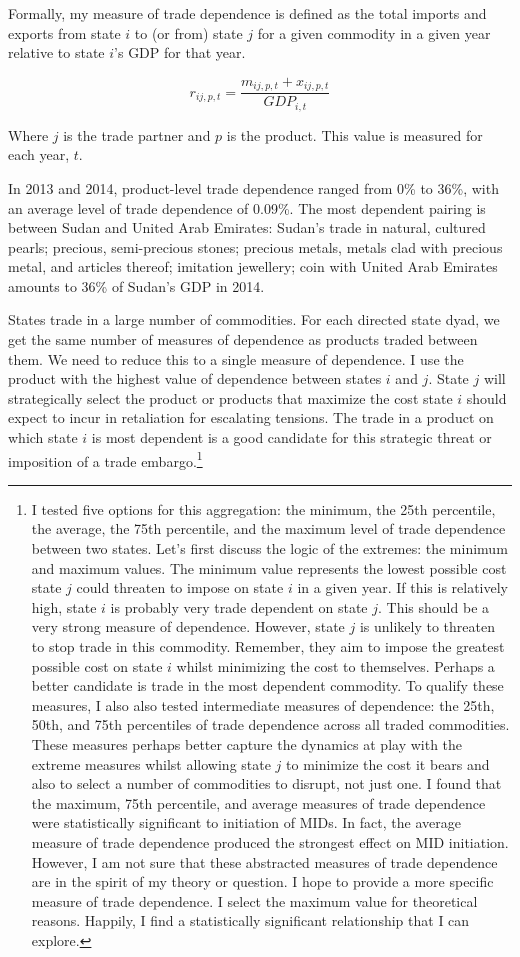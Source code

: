 \documentclass[
  letterpaper,
]{article}
\begin{document}
Formally, my measure of trade dependence is defined as the total imports
and exports from state \(i\) to (or from) state \(j\) for a given
commodity in a given year relative to state \(i\)'s GDP for that year.

\[
r_{ij,p,t} = \frac{m_{ij,p,t} + x_{ij,p,t}}{GDP_{i,t}}
\]

Where \(j\) is the trade partner and \(p\) is the product. This value is
measured for each year, \(t\).

In 2013 and 2014, product-level trade dependence ranged from 0\% to
36\%, with an average level of trade dependence of 0.09\%. The most
dependent pairing is between Sudan and United Arab Emirates: Sudan's
trade in natural, cultured pearls; precious, semi-precious stones;
precious metals, metals clad with precious metal, and articles thereof;
imitation jewellery; coin with United Arab Emirates amounts to 36\% of
Sudan's GDP in 2014.

States trade in a large number of commodities. For each directed state
dyad, we get the same number of measures of dependence as products
traded between them. We need to reduce this to a single measure of
dependence. I use the product with the highest value of dependence
between states \(i\) and \(j\). State \(j\) will strategically select
the product or products that maximize the cost state \(i\) should expect
to incur in retaliation for escalating tensions. The trade in a product
on which state \(i\) is most dependent is a good candidate for this
strategic threat or imposition of a trade embargo.\footnote{I tested
  five options for this aggregation: the minimum, the 25th percentile,
  the average, the 75th percentile, and the maximum level of trade
  dependence between two states. Let's first discuss the logic of the
  extremes: the minimum and maximum values. The minimum value represents
  the lowest possible cost state \(j\) could threaten to impose on state
  \(i\) in a given year. If this is relatively high, state \(i\) is
  probably very trade dependent on state \(j\). This should be a very
  strong measure of dependence. However, state \(j\) is unlikely to
  threaten to stop trade in this commodity. Remember, they aim to impose
  the greatest possible cost on state \(i\) whilst minimizing the cost
  to themselves. Perhaps a better candidate is trade in the most
  dependent commodity. To qualify these measures, I also also tested
  intermediate measures of dependence: the 25th, 50th, and 75th
  percentiles of trade dependence across all traded commodities. These
  measures perhaps better capture the dynamics at play with the extreme
  measures whilst allowing state \(j\) to minimize the cost it bears and
  also to select a number of commodities to disrupt, not just one. I
  found that the maximum, 75th percentile, and average measures of trade
  dependence were statistically significant to initiation of MIDs. In
  fact, the average measure of trade dependence produced the strongest
  effect on MID initiation. However, I am not sure that these abstracted
  measures of trade dependence are in the spirit of my theory or
  question. I hope to provide a more specific measure of trade
  dependence. I select the maximum value for theoretical reasons.
  Happily, I find a statistically significant relationship that I can
  explore.}
\end{document}
